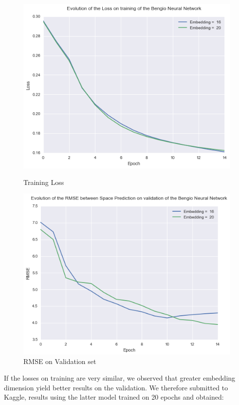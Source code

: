 \documentclass[11pt]{article}
\begin{document}
\begin{figure}[H]
\centering
\begin{minipage}{.5\textwidth}
  \centering
  \includegraphics[width=1\linewidth]{train_nn_em}
  \caption{Training Loss}
\end{minipage}%
\begin{minipage}{.5\textwidth}
  \centering
  \includegraphics[width=1\linewidth]{rmse_em}
  \caption{RMSE on Validation set}
\end{minipage}
\end{figure}

If the losses on training are very similar, we observed that greater embedding dimension yield better results on the validation. We therefore submitted to Kaggle, results using the latter model trained on 20 epochs and obtained:
\end{document}
